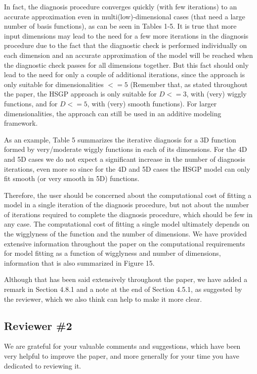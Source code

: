 \documentclass[11pt]{report}
\begin{document}
In fact, the diagnosis procedure converges quickly (with few iterations) to an accurate approximation even in multi(low)-dimensional cases (that need a large number of basis functions), as can be seen in Tables 1-5. It is true that more input dimensions may lead to the need for a few more iterations in the diagnosis procedure due to the fact that the diagnostic check is performed individually on each dimension and an accurate approximation of the model will be reached when the diagnostic check passes for all dimensions together. But this fact should only lead to the need for only a couple of additional iterations, since the approach is only suitable for dimensionalities $<= 5$ (Remember that, as stated throughout the paper, the HSGP approach is only suitable for $D<=3$, with (very) wiggly functions, and for $D<=5$, with (very) smooth functions). For larger dimensionalities, the approach can still be used in an additive modeling framework. 

As an example, Table 5 summarizes the iterative diagnosis for a 3D function formed by very/moderate wiggly functions in each of its dimensions. For the 4D and 5D cases we do not expect a significant increase in the number of diagnosis iterations, even more so since for the 4D and 5D cases the HSGP model can only fit smooth (or very smooth in 5D) functions.

Therefore, the user should be concerned about the computational cost of fitting a model in a single iteration of the diagnosis procedure, but not about the number of iterations required to complete the diagnosis procedure, which should be few in any case. The computational cost of fitting a single model ultimately depends on the wigglyness of the function and the number of dimensions. We have provided extensive information throughout the paper on the computational requirements for model fitting as a function of wigglyness and number of dimensions, information that is also summarized in Figure 15.

Although that has been said extensively throughout the paper, we have added a remark in Section 4.8.1 and a note at the end of Section 4.5.1, as suggested by the reviewer, which we also think can help to make it more clear.

\subsection*{Reviewer \#2}

We are grateful for your valuable comments and suggestions, which have been very helpful to improve the paper, and more generally for your time you have dedicated to reviewing it.
\end{document}
